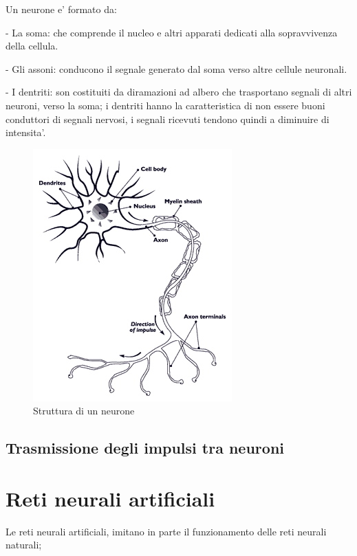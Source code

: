 \documentclass[a4paper,10pt]{book}
\begin{document}
Un neurone e' formato da:

 - La soma: che comprende il nucleo e altri apparati dedicati alla sopravvivenza della
	cellula.
 
 - Gli assoni: conducono il segnale generato dal soma verso altre cellule neuronali.
 
 - I dentriti: son costituiti da diramazioni ad albero che trasportano segnali di altri
	neuroni, verso la soma; i dentriti hanno la caratteristica di non essere buoni
	conduttori di segnali nervosi, i segnali ricevuti tendono quindi a diminuire di
	intensita'.

\begin{figure}[h]
	\begin{center}	
		\includegraphics[scale=0.50]{img/neuron.jpg}
		\caption{Struttura di un neurone}
		\label{fig: Struttura di un neurone}
	\end{center}
\end{figure}
 
\subsection{Trasmissione degli impulsi tra neuroni}



\section{Reti neurali artificiali}
Le reti neurali artificiali, imitano in parte il funzionamento delle
reti neurali naturali;
\end{document}
